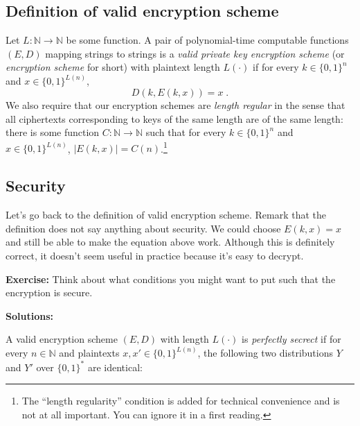\documentclass[10pt]{article}
\newcommand{\N}{\mathbb{N}}
\theoremstyle{definition}
\begin{document}
\subsection{Definition of valid encryption scheme}


Let $L:\N \rightarrow \N$ be some function. A pair of polynomial-time
computable functions $(E,D)$ mapping strings to strings is a \emph{valid
private key encryption scheme} (or \emph{encryption scheme} for short) with
plaintext length $L(\cdot)$ if for every $k\in \{0,1\}^n$ and
$x \in \{0,1\}^{L(n)}$, \begin{equation}D(k,E(k,x))=x \;. \label{eqvalidenc}\end{equation} We also require that our encryption schemes are \emph{length regular} in
the sense that all ciphertexts corresponding to keys of the same length
are of the same length: there is some function $C:\N \rightarrow \N$
such that for every $k\in \{0,1\}^n$ and $x\in \{0,1\}^{L(n)}$,
$|E(k,x)|=C(n)$.\footnote{The ``length regularity'' condition is added for technical
convenience and is not at all important. You can ignore it in a
first reading.}


\subsection{Security}

Let's go back to the definition of valid encryption scheme. Remark that the definition does not say anything about security. We could choose $E(k,x) = x$ and still be able to make the equation above work. Although this is definitely correct, it doesn't seem useful in practice because it's easy to decrypt. 


\textbf{Exercise:} Think about what conditions you might want to put such that the encryption is secure.

\textbf{Solutions:}

A valid encryption scheme $(E,D)$ with length $L(\cdot)$ is \emph{perfectly
secrect} if for every $n\in \N$ and plaintexts
$x,x' \in \{0,1\}^{L(n)}$, the following two distributions $Y$ and $Y'$
over $\{0,1\}^*$ are identical:
\end{document}
